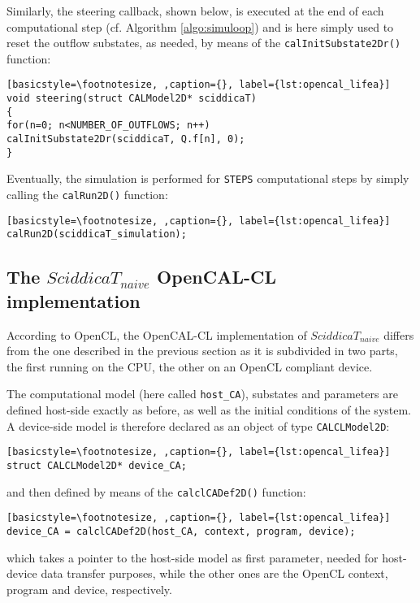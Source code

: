 \noindent Similarly, the steering callback, shown below, is executed at the
end of each computational step (cf. Algorithm \ref{algo:simuloop})
and is here simply used to reset the outflow substates, as needed,
by means of the \verb'calInitSubstate2Dr()' function:

\begin{lstlisting}[basicstyle=\footnotesize, ,caption={}, label={lst:opencal_lifea}]
void steering(struct CALModel2D* sciddicaT)
{
for(n=0; n<NUMBER_OF_OUTFLOWS; n++)
calInitSubstate2Dr(sciddicaT, Q.f[n], 0);
}
\end{lstlisting}

\noindent Eventually, the simulation is performed for \verb'STEPS'
computational steps by simply calling the \verb'calRun2D()'
function:

\begin{lstlisting}[basicstyle=\footnotesize, ,caption={}, label={lst:opencal_lifea}]
calRun2D(sciddicaT_simulation);
\end{lstlisting}


\subsection{The $SciddicaT_{naive}$ OpenCAL-CL implementation}
\label{sec:sciddica_cl}
According to OpenCL, the OpenCAL-CL implementation of
$SciddicaT_{naive}$ differs from the one described in the previous
section as it is subdivided in two parts, the first running on the
CPU, the other on an OpenCL compliant device.

The computational model (here called \verb'host_CA'), substates and
parameters are defined host-side exactly as before, as well as the
initial conditions of the system. A device-side model is therefore
declared as an object of type \verb'CALCLModel2D':

\begin{lstlisting}[basicstyle=\footnotesize, ,caption={}, label={lst:opencal_lifea}]
struct CALCLModel2D* device_CA;
\end{lstlisting}

\noindent and then defined by means of the \verb'calclCADef2D()'
function:

\begin{lstlisting}[basicstyle=\footnotesize, ,caption={}, label={lst:opencal_lifea}]
device_CA = calclCADef2D(host_CA, context, program, device);
\end{lstlisting}

\noindent which takes a pointer to the host-side model as first
parameter, needed for host-device data transfer purposes, while the
other ones are the OpenCL context, program and device, respectively.

